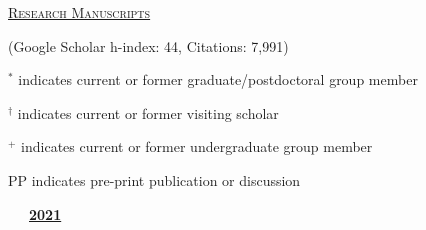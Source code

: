 \documentclass[10pt]{report}
\begin{document}
\vspace*{.1in}
\textsc{\underline{Research Manuscripts}}

{\small (Google Scholar h-index: 44, Citations: 7,991)}
\vspace*{.1in}

{ \small $^{*}$ indicates current or former graduate/postdoctoral group member}

{ \small $^{\dagger}$ indicates current or former visiting scholar}

{ \small $^{+}$ indicates current or former undergraduate group member}


{ PP indicates pre-print publication or discussion}

\vspace*{.1in}

\mbox{\ \ \ \underline{\textbf{2021}}}
\end{document}

